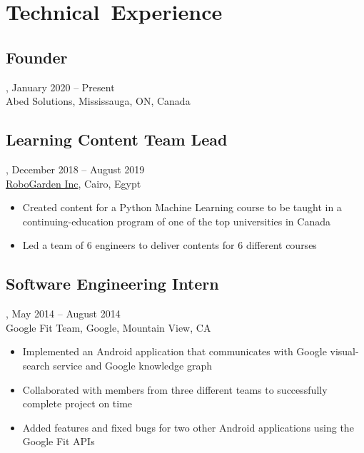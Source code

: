 \section{Technical~Experience}
\subsection{Founder}, January 2020 -- Present\\
Abed Solutions, Mississauga, ON, Canada

\subsection{Learning Content Team Lead}, December 2018 -- August 2019\\
\href{https://robogarden.ca}{RoboGarden Inc}, Cairo, Egypt
\begin{itemize}
    \item Created content for a Python Machine Learning course to be taught in a continuing-education program of one of the top universities in Canada
    \item Led a team of 6 engineers to deliver contents for 6 different courses
\end{itemize}

\subsection{Software Engineering Intern}, May 2014 -- August 2014\\
Google Fit Team, Google, Mountain View, CA
\begin{itemize}
\item Implemented an Android application that communicates with Google visual-search service and Google knowledge graph
\item Collaborated with members from three different teams to successfully complete project on time
\item Added features and fixed bugs for two other Android applications using the Google Fit APIs
\end{itemize}
